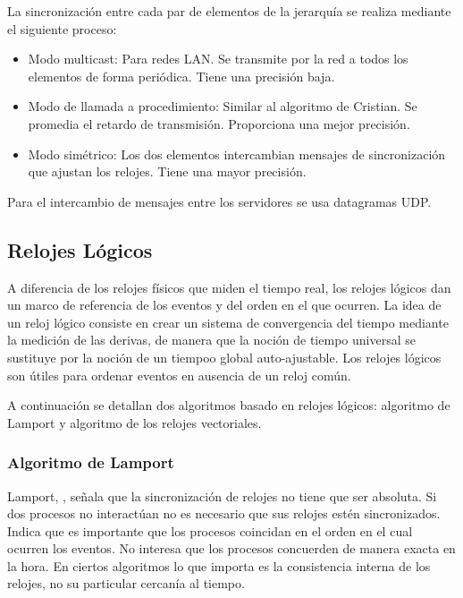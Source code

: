 	
		
	La sincronización entre cada par de elementos de la 	jerarquía se realiza mediante el siguiente proceso:
	\begin{itemize}
		\item  Modo multicast: Para redes LAN. Se transmite por la red a todos los elementos de forma periódica. Tiene una   precisión baja.
		\item Modo de llamada a procedimiento: Similar al algoritmo de Cristian. Se promedia el retardo de transmisión. Proporciona una mejor 	precisión.
		\item Modo simétrico: Los dos elementos intercambian mensajes de sincronización que ajustan los relojes. Tiene una mayor precisión.
	\end{itemize}
		 
		Para el intercambio de mensajes   entre los servidores se usa datagramas UDP.
			
		 
			\subsection{Relojes L\'ogicos}
						
			A diferencia de los relojes f\'isicos que miden el tiempo real, los relojes l\'ogicos dan un marco de referencia de los eventos y del orden en el que ocurren.			
			La idea de un reloj lógico consiste en crear un sistema de convergencia del tiempo mediante la medición de las derivas, de manera que la noción de tiempo universal se sustituye por la noción de un tiempoo global auto-ajustable. Los relojes lógicos son útiles para ordenar eventos en ausencia de un reloj común.
			
			A continuaci\'on se detallan dos algoritmos basado en relojes l\'ogicos: algoritmo de Lamport y algoritmo de los relojes vectoriales.
		 
			\subsubsection{Algoritmo de Lamport}	
			 
				 
			Lamport,  \cite{Raptis2020} \cite{Czaja2018} \cite{Lamport1978},  señala que la sincronización de relojes no tiene que ser absoluta. Si dos procesos no interactúan no es necesario que sus relojes estén sincronizados. 
			Indica que es importante que  los procesos coincidan en el orden en el cual ocurren los eventos. No interesa  que los procesos  concuerden de manera exacta en la hora.
			En ciertos  algoritmos lo que  importa es la consistencia interna de los relojes, no su particular cercanía al tiempo.
				 
